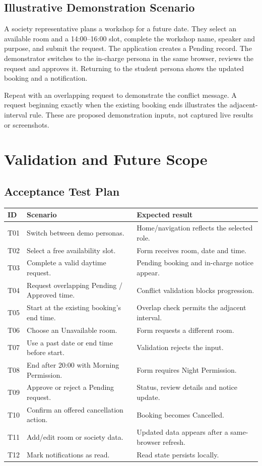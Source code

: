 \documentclass[11pt,a4paper]{report}
\begin{document}
\section{Illustrative Demonstration Scenario}
A society representative plans a workshop for a future date. They select an available room and a 14:00--16:00 slot, complete the workshop name, speaker and purpose, and submit the request. The application creates a Pending record. The demonstrator switches to the in-charge persona in the same browser, reviews the request and approves it. Returning to the student persona shows the updated booking and a notification.

Repeat with an overlapping request to demonstrate the conflict message. A request beginning exactly when the existing booking ends illustrates the adjacent-interval rule. These are proposed demonstration inputs, not captured live results or screenshots.
\chapter{Validation and Future Scope}
\section{Acceptance Test Plan}
\begin{longtable}{@{}p{12mm}p{65mm}p{70mm}@{}}\toprule ID & Scenario & Expected result\\\midrule\endhead
T01 & Switch between demo personas. & Home/navigation reflects the selected role.\\
T02 & Select a free availability slot. & Form receives room, date and time.\\
T03 & Complete a valid daytime request. & Pending booking and in-charge notice appear.\\
T04 & Request overlapping Pending / Approved time. & Conflict validation blocks progression.\\
T05 & Start at the existing booking's end time. & Overlap check permits the adjacent interval.\\
T06 & Choose an Unavailable room. & Form requests a different room.\\
T07 & Use a past date or end time before start. & Validation rejects the input.\\
T08 & End after 20:00 with Morning Permission. & Form requires Night Permission.\\
T09 & Approve or reject a Pending request. & Status, review details and notice update.\\
T10 & Confirm an offered cancellation action. & Booking becomes Cancelled.\\
T11 & Add/edit room or society data. & Updated data appears after a same-browser refresh.\\
T12 & Mark notifications as read. & Read state persists locally.\\\bottomrule\end{longtable}
\end{document}
